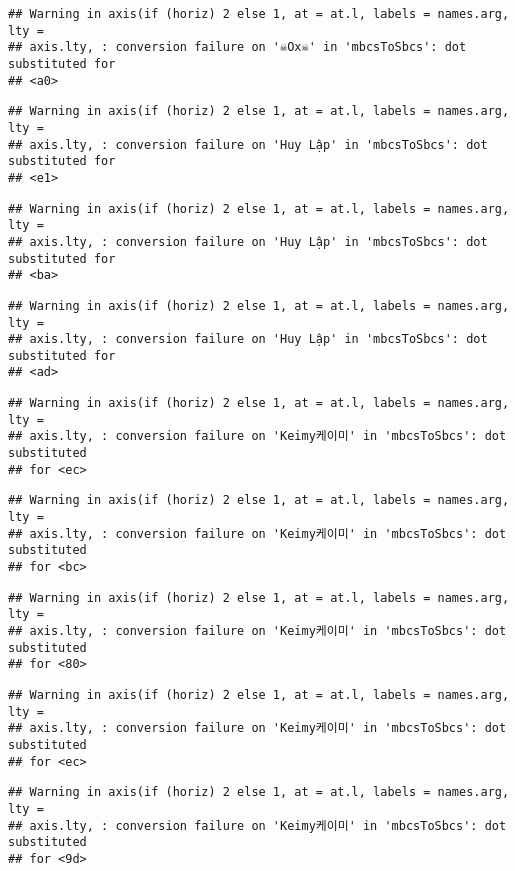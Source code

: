 \documentclass[
]{article}
\begin{document}
\begin{verbatim}
## Warning in axis(if (horiz) 2 else 1, at = at.l, labels = names.arg, lty =
## axis.lty, : conversion failure on '☠Ox☠' in 'mbcsToSbcs': dot substituted for
## <a0>
\end{verbatim}

\begin{verbatim}
## Warning in axis(if (horiz) 2 else 1, at = at.l, labels = names.arg, lty =
## axis.lty, : conversion failure on 'Huy Lập' in 'mbcsToSbcs': dot substituted for
## <e1>
\end{verbatim}

\begin{verbatim}
## Warning in axis(if (horiz) 2 else 1, at = at.l, labels = names.arg, lty =
## axis.lty, : conversion failure on 'Huy Lập' in 'mbcsToSbcs': dot substituted for
## <ba>
\end{verbatim}

\begin{verbatim}
## Warning in axis(if (horiz) 2 else 1, at = at.l, labels = names.arg, lty =
## axis.lty, : conversion failure on 'Huy Lập' in 'mbcsToSbcs': dot substituted for
## <ad>
\end{verbatim}

\begin{verbatim}
## Warning in axis(if (horiz) 2 else 1, at = at.l, labels = names.arg, lty =
## axis.lty, : conversion failure on 'Keimy케이미' in 'mbcsToSbcs': dot substituted
## for <ec>
\end{verbatim}

\begin{verbatim}
## Warning in axis(if (horiz) 2 else 1, at = at.l, labels = names.arg, lty =
## axis.lty, : conversion failure on 'Keimy케이미' in 'mbcsToSbcs': dot substituted
## for <bc>
\end{verbatim}

\begin{verbatim}
## Warning in axis(if (horiz) 2 else 1, at = at.l, labels = names.arg, lty =
## axis.lty, : conversion failure on 'Keimy케이미' in 'mbcsToSbcs': dot substituted
## for <80>
\end{verbatim}

\begin{verbatim}
## Warning in axis(if (horiz) 2 else 1, at = at.l, labels = names.arg, lty =
## axis.lty, : conversion failure on 'Keimy케이미' in 'mbcsToSbcs': dot substituted
## for <ec>
\end{verbatim}

\begin{verbatim}
## Warning in axis(if (horiz) 2 else 1, at = at.l, labels = names.arg, lty =
## axis.lty, : conversion failure on 'Keimy케이미' in 'mbcsToSbcs': dot substituted
## for <9d>
\end{verbatim}
\end{document}
